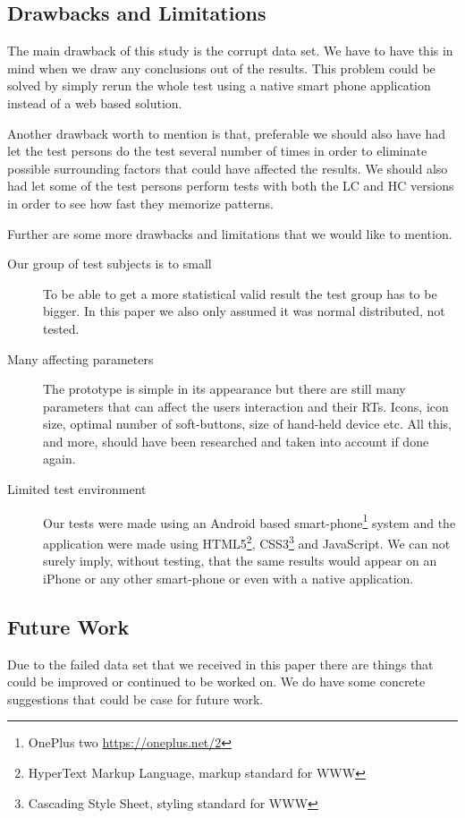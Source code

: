 \documentclass[runningheads,a4paper]{llncs}
\begin{document}
\subsection{Drawbacks and Limitations}\label{subsec:drawbacks}
The main drawback of this study is the corrupt data set. We have to have this in mind when we draw any conclusions out of the results. This problem could be solved by simply rerun the whole test using a native smart phone application instead of a web based solution.

Another drawback worth to mention is that, preferable we should also have had let the test persons do the test several number of times in order to eliminate possible surrounding factors that could have affected the results. We should also had let some of the test persons perform tests with both the LC and HC versions in order to see how fast they memorize patterns. 

Further are some more drawbacks and limitations that we would like to mention.
\begin{description}
	\item[Our group of test subjects is to small] To be able to get a more statistical valid result the test group has to be bigger. In this paper we also only assumed it was normal distributed, not tested.
	\item[Many affecting parameters] The prototype is simple in its appearance but there are still many parameters that can affect the users interaction and their RTs. Icons, icon size, optimal number of soft-buttons, size of hand-held device etc. All this, and more, should have been researched and taken into account if done again. 
	\item[Limited test environment] Our tests were made using an Android based smart-phone\footnote{OnePlus two \url{https://oneplus.net/2}} system and the application were made using HTML5\footnote{HyperText Markup Language, markup standard for WWW}, CSS3\footnote{Cascading Style Sheet, styling standard for WWW} and JavaScript. We can not surely imply, without testing, that the same results would appear on an iPhone or any other smart-phone or even with a native application.
\end{description}

\subsection{Future Work}
Due to the failed data set that we received in this paper there are things that could be improved or continued to be worked on. 
We do have some concrete suggestions that could be case for future work. 
\end{document}
